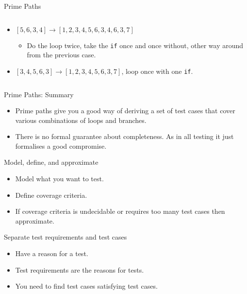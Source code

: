 \documentclass[handout]{beamer}
\begin{document}
\begin{frame}{Prime Paths}
\begin{columns}
\begin{column}{0.65\textwidth}
\begin{itemize}
\begin{itemize}
    \end{itemize}
  \item $[5,6,3,4] \rightarrow   [1,2,3,4,5,6,3,4,6,3,7]$
    \begin{itemize}
    \item Do the loop twice, take the {\tt if} once and once without,
      other way around from the previous case.
    \end{itemize}
  \item $[3,4,5,6,3] \rightarrow [1,2,3,4,5,6,3,7]$, loop once with
    one {\tt if}.
  \end{itemize}
\end{column}
\end{columns}
\end{frame}

\begin{frame}{Prime Paths: Summary}
  \begin{itemize}
  \item Prime paths give you a good way of deriving a set of test
    cases that cover various combinations of loops and branches.
  \item There is no formal guarantee about completeness. As in all
    testing it just formalises a good compromise. 
  \end{itemize}

\end{frame}
\begin{frame}{Model, define, and approximate}
  \begin{itemize}
  \item Model what you want to test.
  \item Define coverage criteria.
  \item If coverage criteria is undecidable or requires too many test
    cases then approximate. 
  \end{itemize}
 \end{frame}
\begin{frame}{Separate test requirements and test cases}
  \begin{itemize}
  \item Have a reason for a test.
  \item Test requirements are the reasons for tests.
  \item You need to find test cases satisfying test cases. 
  \end{itemize}
 
\end{frame}

\end{document}
